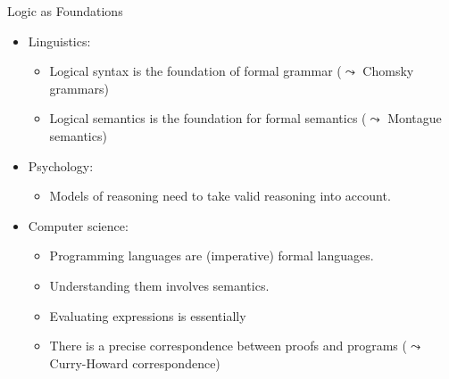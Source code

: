 \documentclass[../slides.tex]{subfiles}
\begin{document}
\begin{frame}{Logic as Foundations}%

  \begin{itemize}
  \item Linguistics:
  \begin{itemize}
  \item Logical syntax is the foundation of formal grammar ($\leadsto$
    Chomsky grammars)
  \item Logical semantics is the foundation for formal semantics
    ($\leadsto$ Montague semantics)
  \end{itemize}
  \item Psychology:
    \begin{itemize}
    \item Models of reasoning need to take valid reasoning into
      account.
    \end{itemize}
    \item Computer science:
      \begin{itemize}
      \item Programming languages are (imperative) formal languages.
       \item Understanding them involves semantics.
         \item Evaluating expressions is essentially 
         \item There is a precise correspondence between proofs and
           programs ($\leadsto$ Curry-Howard correspondence) 
      \end{itemize}
  \end{itemize}
  
\end{frame}
\end{document}
